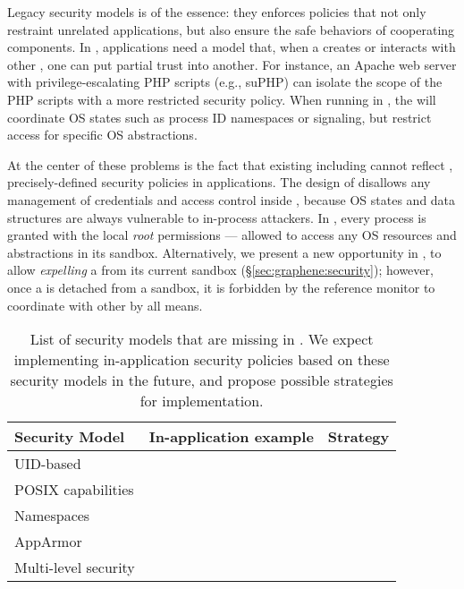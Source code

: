 Legacy security models is of the essence:
they enforces policies that not only restraint unrelated applications,
but also ensure the safe behaviors of cooperating components.
In \liboses{}, applications need a model that,
when a \picoproc{} creates or interacts with other \picoprocs{},
one can put partial trust into another.
For instance,
an Apache web server with privilege-escalating PHP scripts (e.g., suPHP)
can isolate the scope of
the PHP scripts
with a more restricted security policy.
When running in \graphene{},
the \picoprocs{} will coordinate OS states such as process ID namespaces or signaling,
but restrict access for specific OS abstractions. 




At the center of these problems is the fact that existing \liboses{} including \graphene{}
cannot reflect ,
precisely-defined security policies in applications.
The design of \picoprocs{} disallows any management of credentials and access control inside \liboses{},
because OS states and data structures are always
vulnerable to in-process attackers. %
In \graphene{}, every process is granted with the local \emph{root} permissions
--- allowed to access any OS resources and abstractions
in its sandbox.
Alternatively, we present a new opportunity in \graphene{},
to allow \emph{expelling} a \picoproc{} from its current sandbox (\S\ref{sec:graphene:security});
however, once a \picoproc{} is detached from a sandbox,
it is forbidden by the reference monitor to coordinate with other \picoprocs{}
by all means.


\begin{table}[t]
\footnotesize
\centering
\begin{tabular}{|p{1.2in}|p{2.4in}|p{2.4in}|}
\hline
{\bf Security Model} & {\bf In-application example} & {\bf Strategy} \\
\hline
UID-based &  &  \\
\hline
POSIX capabilities & &  \\
\hline
Namespaces & &  \\
\hline
AppArmor &  &  \\
\hline
Multi-level security &  &  \\
\hline
\end{tabular}
\caption[List of security models to be added in \graphene{} as future works]
{List of security models that are missing in \graphene{}.
We expect implementing in-application security policies based on these security models in the future, and propose possible strategies for implementation.}
\label{tab:future:security}
\end{table}

